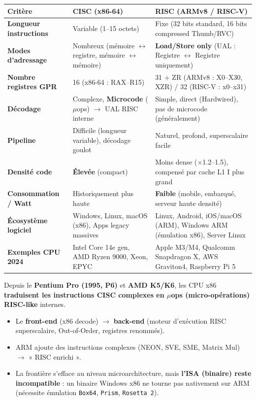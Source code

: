 \documentclass[11pt]{article}
\begin{document}
\begin{center}
\begin{tabularx}{\linewidth}{|l|X|X|}
\hline
\rowcolor{popblueL}
\textbf{Critère} & \textbf{CISC (x86-64)} & \textbf{RISC (ARMv8 / RISC-V)} \\
\hline
\textbf{Longueur instructions} & Variable (1--15 octets) & Fixe (32 bits standard, 16 bits compressed Thumb/RVC) \\
\hline
\textbf{Modes d'adressage} & Nombreux (mémoire $\leftrightarrow$ registre, mémoire $\leftrightarrow$ mémoire) & \textbf{Load/Store only} (UAL : Registre $\leftrightarrow$ Registre uniquement) \\
\hline
\textbf{Nombre registres GPR} & 16 (x86-64 : RAX--R15) & 31 + ZR (ARMv8 : X0--X30, XZR) / 32 (RISC-V : x0--x31) \\
\hline
\textbf{Décodage} & Complexe, \textbf{Microcode} ($\mu$ops) $\to$ UAL RISC interne & Simple, direct (Hardwired), pas de microcode (généralement) \\
\hline
\textbf{Pipeline} & Difficile (longueur variable), décodage goulot & Naturel, profond, superscalaire facile \\
\hline
\textbf{Densité code} & \textbf{Élevée} (compact) & Moins dense ($\times$1.2--1.5), compensé par cache L1 I plus grand \\
\hline
\textbf{Consommation / Watt} & Historiquement plus haute & \textbf{Faible} (mobile, embarqué, serveur haute densité) \\
\hline
\textbf{Écosystème logiciel} & Windows, Linux, macOS (x86), Apps legacy massives & Linux, Android, iOS/macOS (ARM), Windows ARM (émulation x86), Server Linux \\
\hline
\textbf{Exemples CPU 2024} & Intel Core 14e gen, AMD Ryzen 9000, Xeon, EPYC & Apple M3/M4, Qualcomm Snapdragon X, AWS Graviton4, Raspberry Pi 5 \\
\hline
\end{tabularx}
\end{center}

\begin{aretenir}
Depuis le \textbf{Pentium Pro (1995, P6)} et \textbf{AMD K5/K6}, les CPU x86 \textbf{traduisent les instructions CISC complexes en $\mu$ops (micro-opérations) RISC-like} internes.
\begin{itemize}
    \item Le \textbf{front-end} (x86 decode) $\to$ \textbf{back-end} (moteur d'exécution RISC superscalaire, Out-of-Order, registres renommés).
    \item ARM ajoute des instructions complexes (NEON, SVE, SME, Matrix Mul) $\to$ « RISC enrichi ».
    \item La frontière s'efface au niveau microarchitecture, mais \textbf{l'ISA (binaire) reste incompatible} : un binaire Windows x86 ne tourne pas nativement sur ARM (nécessite émulation \texttt{Box64}, \texttt{Prism}, \texttt{Rosetta 2}).
\end{itemize}
\end{aretenir}
\end{document}
